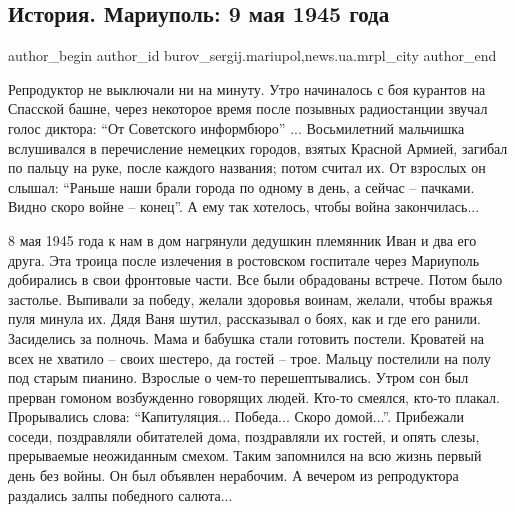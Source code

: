  
 
 
 
 
 
\subsection{История. Мариуполь: 9 мая 1945 года}
\label{sec:08_05_2017.stz.news.ua.mrpl_city.1.istoria_mariupol_9_maja_1945_goda}
 
\ifcmt
 author_begin
   author_id burov_sergij.mariupol,news.ua.mrpl_city
 author_end
\fi

Репродуктор не выключали ни на минуту. Утро начиналось с боя курантов на
Спасской башне, через некоторое время после позывных радиостанции звучал голос
диктора: \enquote{От Советского информбюро} ... Восьмилетний мальчишка вслушивался в
перечисление немецких городов, взятых Красной Армией, загибал по пальцу на
руке, после каждого названия; потом считал их. От взрослых он слышал: \enquote{Раньше
наши брали города по одному в день, а сейчас – пачками. Видно скоро войне –
конец}. А ему так хотелось, чтобы война закончилась...

8 мая 1945 года к нам в дом нагрянули дедушкин племянник Иван и два его друга.
Эта троица после излечения в ростовском госпитале через Мариуполь добирались в
свои фронтовые части. Все были обрадованы встрече. Потом было застолье.
Выпивали за победу, желали здоровья воинам, желали, чтобы вражья пуля минула
их. Дядя Ваня шутил, рассказывал о боях, как и где его ранили. Засиделись за
полночь. Мама и бабушка стали готовить постели. Кроватей на всех не хватило –
своих шестеро, да гостей – трое. Мальцу постелили на полу под старым пианино.
Взрослые о чем-то перешептывались. Утром сон был прерван гомоном возбужденно
говорящих людей. Кто-то смеялся, кто-то плакал. Прорывались слова:
\enquote{Капитуляция... Победа... Скоро домой...}. Прибежали соседи, поздравляли обитателей
дома, поздравляли их гостей, и опять слезы, прерываемые неожиданным смехом.
Таким запомнился на всю жизнь первый день без войны. Он был объявлен нерабочим.
А вечером из репродуктора раздались залпы победного салюта...

